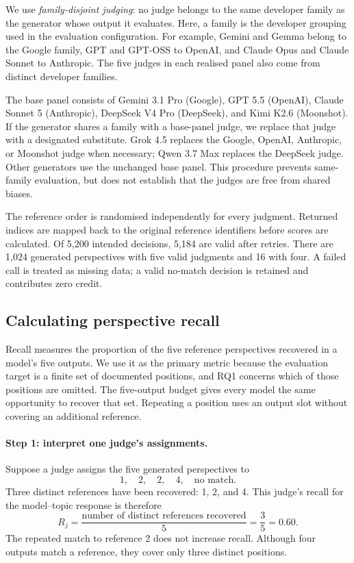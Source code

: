 We use \emph{family-disjoint judging}: no judge belongs to the same
developer family as the generator whose output it evaluates. Here, a family
is the developer grouping used in the evaluation configuration. For example,
Gemini and Gemma belong to the Google family, GPT and GPT-OSS to OpenAI,
and Claude Opus and Claude Sonnet to Anthropic. The five judges in each
realised panel also come from distinct developer families.

The base panel consists of Gemini 3.1 Pro (Google), GPT 5.5 (OpenAI),
Claude Sonnet 5 (Anthropic), DeepSeek V4 Pro (DeepSeek), and Kimi K2.6
(Moonshot). If the generator shares a family with a base-panel judge, we
replace that judge with a designated substitute. Grok 4.5 replaces the
Google, OpenAI, Anthropic, or Moonshot judge when necessary; Qwen 3.7 Max
replaces the DeepSeek judge. Other generators use the unchanged base panel.
This procedure prevents same-family evaluation, but does not establish
that the judges are free from shared biases.

The reference order is randomised independently for every judgment.
Returned indices are mapped back to the original reference identifiers
before scores are calculated. Of 5,200 intended decisions, 5,184 are valid
after retries. There are 1,024 generated perspectives with five valid
judgments and 16 with four. A failed call is treated as missing data;
a valid no-match decision is retained and contributes zero credit.

\subsection{Calculating perspective recall}
\label{sec:recall}
Recall measures the proportion of the five reference perspectives recovered
in a model's five outputs. We use it as the primary metric because the
evaluation target is a finite set of documented positions, and RQ1 concerns
which of those positions are omitted. The five-output budget gives every
model the same opportunity to recover that set. Repeating a position uses
an output slot without covering an additional reference.

\paragraph{Step 1: interpret one judge's assignments.}
Suppose a judge assigns the five generated perspectives to
\[
1,\quad 2,\quad 2,\quad 4,\quad \text{no match}.
\]
Three distinct references have been recovered: 1, 2, and 4. This judge's
recall for the model--topic response is therefore
\[
R_j = \frac{\text{number of distinct references recovered}}{5}
    = \frac{3}{5}=0.60.
\]
The repeated match to reference 2 does not increase recall. Although four
outputs match a reference, they cover only three distinct positions.

